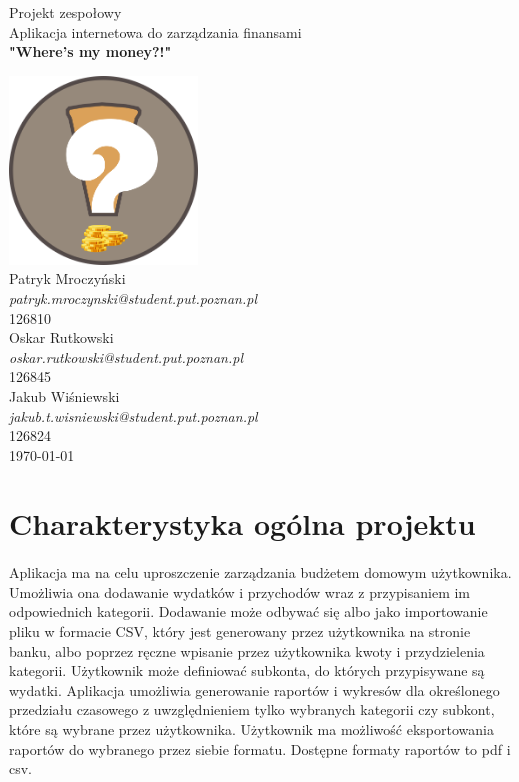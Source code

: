 \documentclass{article}
\begin{document}
		\begin{titlepage}
		\centering

		\Huge{
			\indexspace Projekt zespołowy \\
			\indexspace Aplikacja internetowa do zarządzania finansami \\[1cm]
			\indexspace \textbf{"Where's my money?!"\\[1cm]}}

		\includegraphics[width=5cm]{assets/logo.png}\\[1cm]
		\Large{Patryk Mroczyński \\ \textlangle{}\textit{patryk.mroczynski@student.put.poznan.pl}\textrangle{} \\126810\\
		Oskar Rutkowski \\ \textlangle{}\textit{oskar.rutkowski@student.put.poznan.pl}\textrangle{} \\126845 \\
		Jakub Wiśniewski \\ \textlangle{}\textit{jakub.t.wisniewski@student.put.poznan.pl}\textrangle{} \\126824 \\[0.5cm]}
	\today

	\end{titlepage}
	\newpage
	\tableofcontents
	\newpage

	\section{Charakterystyka ogólna projektu}
	\paragraph{} Aplikacja ma na celu uproszczenie zarządzania budżetem domowym użytkownika. Umożliwia ona dodawanie wydatków i przychodów wraz z przypisaniem im odpowiednich kategorii. Dodawanie może odbywać się albo jako importowanie pliku w formacie CSV, który jest generowany przez użytkownika na stronie banku, albo poprzez ręczne wpisanie przez użytkownika kwoty i przydzielenia kategorii. Użytkownik może definiować subkonta, do których przypisywane są wydatki. Aplikacja umożliwia generowanie raportów i wykresów dla określonego przedziału czasowego z uwzględnieniem tylko wybranych kategorii czy subkont, które są wybrane przez użytkownika. Użytkownik ma możliwość eksportowania raportów do wybranego przez siebie formatu. Dostępne formaty raportów to pdf i csv.
\end{document}
